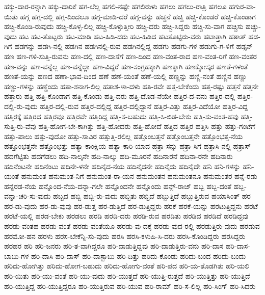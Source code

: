 {ಹಕ್ಕು-ದಾರ-ರನ್ನಾಗಿ
ಹಕ್ಕು-ದಾರಿಕೆ
ಹಗ-ಲೆಲ್ಲ
ಹಗಲಿ-ನಷ್ಟೇ
ಹಗಲಿರುಳು
ಹಗಲು
ಹಗಲು-ರಾತ್ರಿ
ಹಗಲೂ
ಹಗುರ-ವಾ-ಯಿತು
ಹಗ್ಗ
ಹಗ್ಗ-ದಲ್ಲಿ
ಹಗ್ಗ-ದಿಂದಲೂ
ಹಗ್ಗ-ಮಾಡಿ-ದರೆ
ಹಗ್ಗ-ವನ್ನು
ಹಚ್ಚನೆ
ಹಚ್ಚಿ
ಹಚ್ಚಿ-ಕೊಂಡರೆ
ಹಚ್ಚಿ-ಕೊಂಡಾಗ
ಹಚ್ಚಿ-ಕೊಂಡಿ-ರುವುದು
ಹಚ್ಚಿ-ಕೊಳ್ಳ-ಲಿಲ್ಲ
ಹಚ್ಚಿ-ಕೊಳ್ಳುತ್ತೀರಿ
ಹಚ್ಚಿ-ದರು
ಹಚ್ಚಿ-ಸಿದ್ದರು
ಹಚ್ಚಿ-ಸು-ವಾಗ
ಹಚ್ಚಿಸು
ಹಚ್ಚು-ವುದು
ಹಟ
ಹಟ-ತೊಟ್ಟರು
ಹಟ-ಮಾಡಿ
ಹಟ-ಹಿಡಿ-ದರು
ಹಟ-ಹಿಡಿದ
ಹಟತೊಟ್ಟಿರು-ವರು
ಹಟಾತ್ತಾಗಿ
ಹಠಾತ್
ಹಡ-ಗಿಗೆ
ಹಡಗನ್ನು
ಹಡಗಿ-ನಲ್ಲಿ
ಹಡಗಿನ
ಹಡಗಿನಲ್ಲಿ-ರುವ
ಹಡಗಿನಲ್ಲಿದ್ದ
ಹಡಗು
ಹಡಗು-ಗಳ
ಹಡುಗು-ಗ-ಳಿಗೆ
ಹಡ್ಸನ್
ಹಣ
ಹಣ-ಗಳಿ-ಸುತ್ತಿ-ರುವನು
ಹಣ-ದಲ್ಲಿ
ಹಣ-ದಾಸೆಗೆ
ಹಣ-ದಿಂದ
ಹಣ-ವಂತ-ರಾದ
ಹಣ-ವಂತ-ರಿಗೆ
ಹಣ-ವಂತರ
ಹಣ-ವನ್ನು
ಹಣ-ವನ್ನೆಲ್ಲ
ಹಣ-ವನ್ನೆಲ್ಲಾ
ಹಣ-ವಿದ್ದರೆ
ಹಣ-ಸಂಗ್ರಹಕ್ಕಾಗಿ
ಹಣಕ್ಕಾಗಿ
ಹಣಕ್ಕೋಸ್ಕರ
ಹಣತೆ-ಗಳಂತೆ
ಹಣತೆ-ಯನ್ನು
ಹಣದ
ಹಣಾ-ಭಾವ-ದಿಂದ
ಹಣೆ
ಹಣೆ-ಯಂತೆ
ಹಣೆ-ಯಲ್ಲಿ
ಹಣ್ಣನ್ನು
ಹಣ್ಣಿ-ನಂತೆ
ಹಣ್ಣಿನ
ಹಣ್ಣು
ಹಣ್ಣು-ಗಳನ್ನು
ಹಣ್ಣೆಂದು
ಹತಾ-ಶನಾಗ-ಲಿಲ್ಲ
ಹತಾಶ-ಳಾ-ದಳು
ಹತಿ-ರವೇ
ಹತ್ತ-ಬೇಕೆಂದು
ಹತ್ತ-ರಷ್ಟು
ಹತ್ತನೆ
ಹತ್ತನೇ
ಹತ್ತಾರು
ಹತ್ತಿ
ಹತ್ತಿ-ಕೊಂಡಾಗ
ಹತ್ತಿ-ಕೊಂಡು
ಹತ್ತಿ-ದರು
ಹತ್ತಿ-ದೊಡ-ನೆಯೇ
ಹತ್ತಿರ-ದ-ವನು
ಹತ್ತಿರ-ದಲ್ಲಿ
ಹತ್ತಿರ-ದಲ್ಲಿ-ರು-ವುದು
ಹತ್ತಿರ-ದಲ್ಲಿ-ರುವ
ಹತ್ತಿರ-ದಲ್ಲಿದ್ದ
ಹತ್ತಿರ-ದಲ್ಲಿದ್ದಾನೆ
ಹತ್ತಿರ-ವಿತ್ತು
ಹತ್ತಿರ-ವಿದೆಯೋ
ಹತ್ತಿರ-ವಿದ್ದ
ಹತ್ತಿರಕ್ಕೆ
ಹತ್ತಿರದ
ಹತ್ತಿರವೂ
ಹತ್ತಿರವೇ
ಹತ್ತಿರಿದ್ದ
ಹತ್ತಿ-ಸ-ಬಹುದು
ಹತ್ತಿ-ಸಿ-ಬಿಡ-ಬೇಕು
ಹತ್ತಿ-ಸು-ವಂತ-ಹವು
ಹತ್ತಿ-ಸುತ್ತಿ-ರು-ವೆವು
ಹತ್ತಿ-ಹೋಗ-ಬೇ-ಕಾಗಿತ್ತು
ಹತ್ತಿ-ಹೋದರು
ಹತ್ತಿ-ಹೋದೆ
ಹತ್ತಿದ
ಹತ್ತಿರ
ಹತ್ತಿಸಿ
ಹತ್ತು
ಹತ್ತು-ಗಂಟೆಗೆ
ಹತ್ತು-ಪಾಲು
ಹತ್ತು-ವುದೋ
ಹತ್ತು-ಸಾವಿರ
ಹತ್ತುತ್ತಿ-ರಲಿಲ್ಲ
ಹತ್ತೊಂಬತ್ತನೆ
ಹತ್ತೊಂಬತ್ತನೇ
ಹತ್ತೊಂಭತ್ತ-ನೆಯ
ಹತ್ತೊಂಭತ್ತನೇ
ಹತ್ತೊಂಭತ್ತು
ಹತ್ಯಾ-ಕಾಂಕ್ಷಿಯ
ಹತ್ಯಾ-ಕಾರಿ-ಯಾದ
ಹತ್ರಾ-ಸನ್ನು
ಹತ್ರಾ-ಸಿಗೆ
ಹತ್ರಾಸಿ-ನಲ್ಲಿ
ಹತ್ರಾಸ್
ಹದಗೆಟ್ಟಿತು
ಹದಗೆಡಲು
ಹದಿ-ನಾಲ್ಕನೇ
ಹದಿ-ನಾಲ್ಕು
ಹದಿ-ಮೂರನೆ
ಹದಿನಾರನೆ
ಹದಿನಾ-ರನೇ
ಹದಿನಾರು
ಹದಿನೆಂಟನೇ
ಹದಿನೆಂಟು
ಹದಿನೇ-ಳನೇ
ಹದಿನೈದ-ನೆಯ
ಹದಿನೈದನೇ
ಹದಿನೈದು
ಹದಿನೈದೇ
ಹನಿ
ಹನಿ-ಗಳನ್ನು
ಹನಿ-ಯಂತೆ
ಹನುಮಂತ
ಹನುಮಂತ-ನಿಗೆ
ಹನುಮಂತ-ರಾ-ಯನ
ಹನುಮಂತನ
ಹನುಮಂತನೂ
ಹನುಮಂತರ
ಹನ್ನೆ-ರಡು
ಹನ್ನೆರಡ-ನೆಯ
ಹನ್ನೊಂದ-ನೆಯ-ದನ್ನಾ-ಗಲೇ
ಹನ್ನೊಂದನೇ
ಹನ್ನೊಂದು
ಹನ್ಸ್-ರಾಜ್
ಹಬ್ಬ
ಹಬ್ಬ-ದಂತೆ
ಹಬ್ಬ-ವನ್ನಾ-ಚರಿ-ಸು-ವುದು
ಹಬ್ಬದ
ಹಬ್ಬಿ
ಹಬ್ಬಿ-ರು-ವುದು
ಹಬ್ಬಿತು
ಹಬ್ಬಿದೆ
ಹಬ್ಬುತ್ತಿದೆ
ಹಬ್ಬುತ್ತಿರುವ
ಹಯಾಸಿಂತ್
ಹರ
ಹರ-ಡು-ವುದು
ಹರ-ಡು-ವುವು
ಹರ-ಡುತ್ತ
ಹರ-ಡುತ್ತಿದೆ
ಹರ-ಡುತ್ತಿದ್ದರು
ಹರಕೆ
ಹರಕೆ-ಯನ್ನು
ಹರಟುತ್ತಿದ್ದನು
ಹರಟೆ
ಹರಟೆ-ಯಲ್ಲಿ
ಹರಡ-ಬೇಕು
ಹರಡಲು
ಹರಡಿ
ಹರಡಿ-ದರು
ಹರಡಿ-ರುವ
ಹರಡಿತು
ಹರಡಿದ
ಹರಡಿದೆ
ಹರಡಿದ್ದವು
ಹರಡು-ವಂತಹ
ಹರಡು-ವಂತೆ
ಹರಡು-ವಂತೆಯೂ
ಹರಡು-ವು-ದಕ್ಕೆ
ಹರಡು-ವುದ-ರಲ್ಲಿ
ಹರಡುತ್ತಿರು-ವುದು
ಹರಡುವ
ಹರಮೋ-ಹನ
ಹರಳು
ಹರಸ-ಬೇಕೆನ್ನಿ-ಸು-ವುದು
ಹರಸಿ
ಹರಸಿ-ಕಳುಹಿ-ಸಿ-ದರು
ಹರಸಿ-ಕೊಂಡಿದ್ದರು
ಹರಸಿದ್ದರು
ಹರಹರ
ಹರಿ
ಹರಿ-ಜನರು
ಹರಿ-ತ-ವಾಗಿದ್ದರೂ
ಹರಿ-ದಾಡುತ್ತಿದ್ದವು
ಹರಿ-ದಾಡುತ್ತಿರು-ವನು
ಹರಿ-ದಾಸ
ಹರಿ-ದಾಸ-ಬಾಬು-ಗಳ
ಹರಿ-ದಾಸಿ
ಹರಿ-ದಾಸ್
ಹರಿ-ದಾಸ್ಬಾಬು
ಹರಿ-ದಿತ್ತು
ಹರಿದು-ಕೊಂಡು
ಹರಿದು-ಬಂದ
ಹರಿದು-ಬಂದು
ಹರಿದು-ಹೋಗಿತ್ತು
ಹರಿದು-ಹೋಗ-ಬಹುದು
ಹರಿದು-ಹೋಗು-ವಂತೆ
ಹರಿ-ಪದ
ಹರಿ-ಯ-ತೊಡಗಿತು
ಹರಿ-ಯಲಿ
ಹರಿ-ಯಿತು
ಹರಿ-ಯು-ವಂತೆ
ಹರಿ-ಯು-ವುದು
ಹರಿ-ಯುತ್ತದೆ
ಹರಿ-ಯುತ್ತಿ-ರುತ್ತದೆ
ಹರಿ-ಯುತ್ತಿತ್ತು
ಹರಿ-ಯುತ್ತಿದೆ
ಹರಿ-ಯುತ್ತಿದ್ದ
ಹರಿ-ಯುತ್ತಿದ್ದರೂ
ಹರಿ-ಯುತ್ತಿರುವ
ಹರಿ-ಯುವ
ಹರಿ-ರಾಮ್
ಹರಿ-ಸ-ಲಿಲ್ಲ
ಹರಿ-ಸಿಂಗ್
ಹರಿ-ಸಿದರು
}
